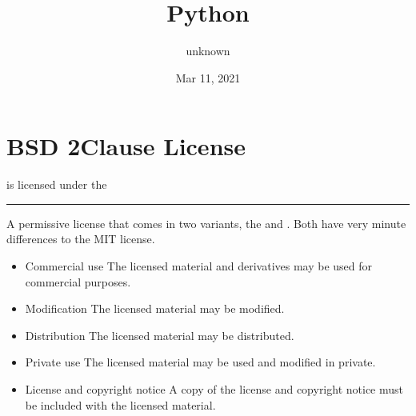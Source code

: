 \documentclass[letterpaper,10pt,english]{sphinxmanual}
\title{Python}
\date{Mar 11, 2021}
\author{unknown}
\begin{document}
\pagestyle{empty}
\sphinxmaketitle
\pagestyle{plain}
\sphinxtableofcontents
\pagestyle{normal}
\label{\detokenize{index::doc}}



\chapter{BSD 2\sphinxhyphen{}Clause License}
\label{\detokenize{examples/bsd-2-clause:bsd-2-clause-license}}\label{\detokenize{examples/bsd-2-clause::doc}}
 is licensed under the 



\bigskip\hrule\bigskip



A permissive license that comes in two variants, the  and . Both have very minute differences to the MIT license.

\vspace{10px}

\begin{itemize}
\item {}
Commercial use \textendash{} The licensed material and derivatives may be used for commercial purposes.

\item {}
Modification \textendash{} The licensed material may be modified.

\item {}
Distribution \textendash{} The licensed material may be distributed.

\item {}
Private use \textendash{} The licensed material may be used and modified in private.

\end{itemize}

\vspace{10px}

\begin{itemize}
\item {}
License and copyright notice \textendash{} A copy of the license and copyright notice must be included with the licensed material.

\end{itemize}
\end{document}
